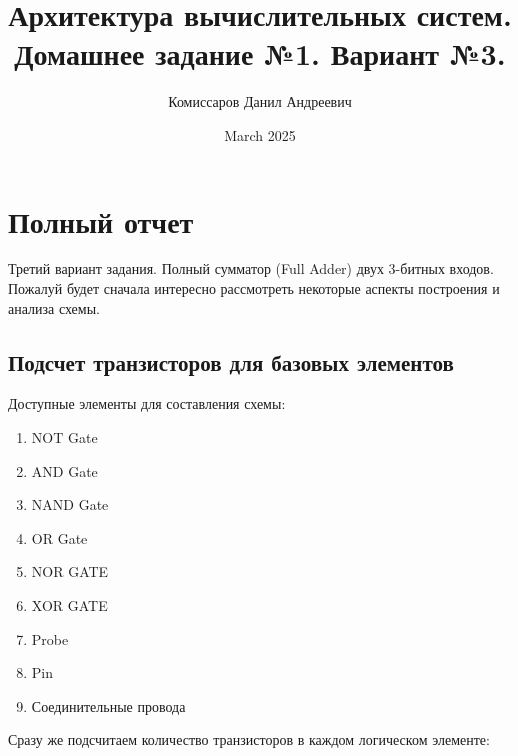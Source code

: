 

\title{Архитектура вычислительных систем. Домашнее задание №1. Вариант №3.}
\author{Комиссаров Данил Андреевич}
\date{March 2025}



\maketitle
\section{Полный отчет}
Третий вариант задания. Полный сумматор (Full Adder) двух 3-битных входов.\\
Пожалуй будет сначала интересно рассмотреть некоторые аспекты построения и анализа схемы.
\subsection{Подсчет транзисторов для базовых элементов}
Доступные элементы для составления схемы:
\begin{enumerate}
    \item NOT Gate
    \item AND Gate
    \item NAND Gate
    \item OR Gate
    \item NOR GATE
    \item XOR GATE
    \item Probe
    \item Pin
    \item Соединительные провода
\end{enumerate}
Сразу же подсчитаем количество транзисторов в каждом логическом элементе:
